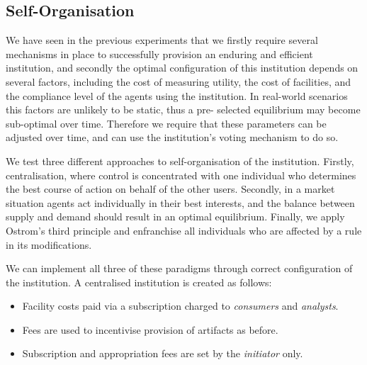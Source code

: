 

\subsection{Self-Organisation}

We have seen in the previous experiments that we firstly require several
mechanisms in place to successfully provision an enduring and efficient
institution, and secondly the optimal configuration of this institution
depends on several factors, including the cost of measuring utility, the cost
of facilities, and the compliance level of the agents using the institution.
In real-world scenarios this factors are unlikely to be static, thus a pre-
selected equilibrium may become sub-optimal over time. Therefore we require
that these parameters can be adjusted over time, and can use the institution's
voting mechanism to do so.

We test three different approaches to self-organisation of the institution.
Firstly, centralisation, where control is concentrated with one individual who
determines the best course of action on behalf of the other users. Secondly,
in a market situation agents act individually in their best interests, and the
balance between supply and demand should result in an optimal equilibrium.
Finally, we apply Ostrom's third principle and enfranchise all individuals who
are affected by a rule in its modifications.

We can implement all three of these paradigms through correct configuration of the institution. A centralised institution is created as follows:

\begin{itemize}
\item Facility costs paid via a subscription charged to \emph{consumers} and \emph{analysts}.
\item Fees are used to incentivise provision of artifacts as before.
\item Subscription and appropriation fees are set by the \emph{initiator} only.
\end{itemize}


